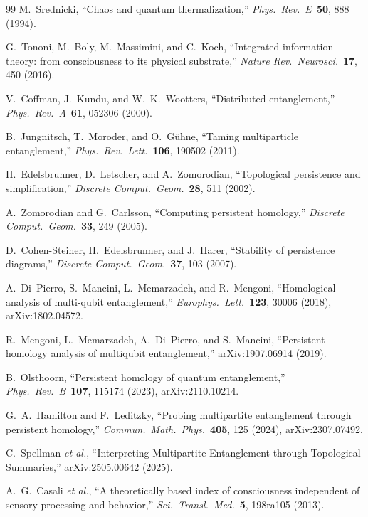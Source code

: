 \documentclass[11pt, a4paper]{article}
\begin{document}
\begin{thebibliography}{99}
M.~Srednicki, ``Chaos and quantum thermalization,'' \textit{Phys.\ Rev.\ E}\ \textbf{50}, 888 (1994).

G.~Tononi, M.~Boly, M.~Massimini, and C.~Koch, ``Integrated information theory: from consciousness to its physical substrate,'' \textit{Nature Rev.\ Neurosci.}\ \textbf{17}, 450 (2016).

V.~Coffman, J.~Kundu, and W.~K.~Wootters, ``Distributed entanglement,'' \textit{Phys.\ Rev.\ A}\ \textbf{61}, 052306 (2000).

B.~Jungnitsch, T.~Moroder, and O.~G\"{u}hne, ``Taming multiparticle entanglement,'' \textit{Phys.\ Rev.\ Lett.}\ \textbf{106}, 190502 (2011).

H.~Edelsbrunner, D.~Letscher, and A.~Zomorodian, ``Topological persistence and simplification,'' \textit{Discrete Comput.\ Geom.}\ \textbf{28}, 511 (2002).

A.~Zomorodian and G.~Carlsson, ``Computing persistent homology,'' \textit{Discrete Comput.\ Geom.}\ \textbf{33}, 249 (2005).

D.~Cohen-Steiner, H.~Edelsbrunner, and J.~Harer, ``Stability of persistence diagrams,'' \textit{Discrete Comput.\ Geom.}\ \textbf{37}, 103 (2007).

A.~Di~Pierro, S.~Mancini, L.~Memarzadeh, and R.~Mengoni, ``Homological analysis of multi-qubit entanglement,'' \textit{Europhys.\ Lett.}\ \textbf{123}, 30006 (2018), arXiv:1802.04572.

R.~Mengoni, L.~Memarzadeh, A.~Di~Pierro, and S.~Mancini, ``Persistent homology analysis of multiqubit entanglement,'' arXiv:1907.06914 (2019).

B.~Olsthoorn, ``Persistent homology of quantum entanglement,'' \textit{Phys.\ Rev.\ B}\ \textbf{107}, 115174 (2023), arXiv:2110.10214.

G.~A.~Hamilton and F.~Leditzky, ``Probing multipartite entanglement through persistent homology,'' \textit{Commun.\ Math.\ Phys.}\ \textbf{405}, 125 (2024), arXiv:2307.07492.

C.~Spellman \textit{et al.}, ``Interpreting Multipartite Entanglement through Topological Summaries,'' arXiv:2505.00642 (2025).

A.~G.~Casali \textit{et al.}, ``A theoretically based index of consciousness independent of sensory processing and behavior,'' \textit{Sci.\ Transl.\ Med.}\ \textbf{5}, 198ra105 (2013).


\end{thebibliography}
\end{document}
